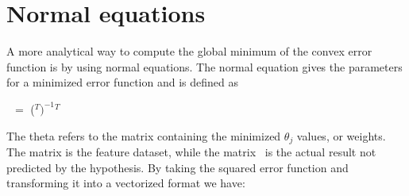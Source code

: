 \documentclass[a4paper,12pt]{article}
\begin{document}
\section{Normal equations}
A more analytical way to compute the global minimum of the convex error function is by using normal equations. The normal equation gives the parameters for a minimized error function and is defined as \cite{normal}
\begin{center}
\boldmath{$\Theta $}\unboldmath \ $=$ (\unboldmath$^T$\unboldmath$)^{-1}$\unboldmath$^T$\unboldmath
\end{center}
The theta refers to the matrix containing the minimized \(\theta_j\) values, or weights. The matrix \unboldmath is the feature dataset, while the matrix \unboldmath \ is the actual result not predicted by the hypothesis. By taking the squared error function and transforming it into a vectorized format we have:
\end{document}
